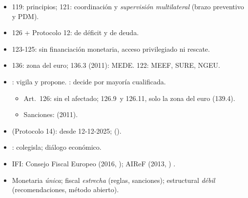\documentclass{article}
\begin{document}
\begin{columnas}
\begin{itemize}
\item 119: principios; 121: coordinación y \emph{supervisión multilateral} (brazo preventivo y PDM).
\item 126 + Protocolo 12:  de déficit y  de deuda.
\item 123-125: sin financiación monetaria, acceso privilegiado ni rescate.
\item 136: zona del euro; 136.3 (2011): MEDE. 122: MEEF, SURE, NGEU.
\end{itemize}
\begin{itemize}
\item {}: vigila y propone. : decide por mayoría cualificada.
  \begin{itemize}
  \item Art.~126: sin el afectado; 126.9~y 126.11, solo la zona del euro (139.4).
  \item Sanciones:  (2011).
  \end{itemize}
\item {} (Protocolo 14):  desde 12-12-2025;  ().
\item {}: colegisla; diálogo económico.
\item IFI: Consejo Fiscal Europeo (2016, ); AIReF (2013, ) .
\end{itemize}
\begin{itemize}
\item Monetaria \emph{única}; fiscal \emph{estrecha} (reglas, sanciones); estructural \emph{débil} (recomendaciones, método abierto).
\end{itemize}


\end{columnas}
\end{document}
